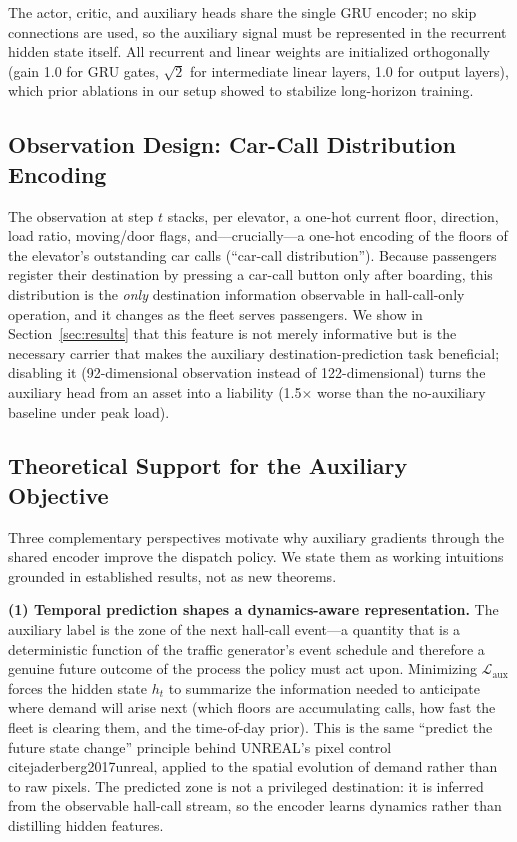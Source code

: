 \documentclass{ieeeaccess}
\begin{document}
The actor, critic, and auxiliary heads share the single GRU encoder;
no skip connections are used, so the auxiliary signal must be
represented in the recurrent hidden state itself. All recurrent and
linear weights are initialized orthogonally (gain 1.0 for GRU gates,
$\sqrt{2}$ for intermediate linear layers, 1.0 for output layers),
which prior ablations in our setup showed to stabilize long-horizon
training.

\subsection{Observation Design: Car-Call Distribution Encoding}

The observation at step $t$ stacks, per elevator, a one-hot current
floor, direction, load ratio, moving/door flags, and---crucially---a
one-hot encoding of the floors of the elevator's outstanding car
calls (``car-call distribution''). Because passengers register their
destination by pressing a car-call button only after boarding, this
distribution is the \emph{only} destination information observable
in hall-call-only operation, and it changes as the fleet serves
passengers. We show in Section~\ref{sec:results} that this feature
is not merely informative but is the necessary carrier that makes
the auxiliary destination-prediction task beneficial; disabling it
(92-dimensional observation instead of 122-dimensional) turns the
auxiliary head from an asset into a liability (1.5$\times$ worse
than the no-auxiliary baseline under peak load).

\subsection{Theoretical Support for the Auxiliary Objective}

Three complementary perspectives motivate why auxiliary gradients
through the shared encoder improve the dispatch policy. We state
them as working intuitions grounded in established results, not as
new theorems.

\textbf{(1) Temporal prediction shapes a dynamics-aware
representation.} The auxiliary label is the zone of the next
hall-call event---a quantity that is a deterministic function of the
traffic generator's event schedule and therefore a genuine future
outcome of the process the policy must act upon. Minimizing
$\mathcal{L}_{\text{aux}}$ forces the hidden state $h_t$ to
summarize the information needed to anticipate where demand will
arise next (which floors are accumulating calls, how fast the fleet
is clearing them, and the time-of-day prior). This is the same
``predict the future state change'' principle behind UNREAL's pixel
control~\\cite{jaderberg2017unreal}, applied to the spatial
evolution of demand rather than to raw pixels. The predicted zone is
not a privileged destination: it is inferred from the observable
hall-call stream, so the encoder learns dynamics rather than
distilling hidden features.
\end{document}

